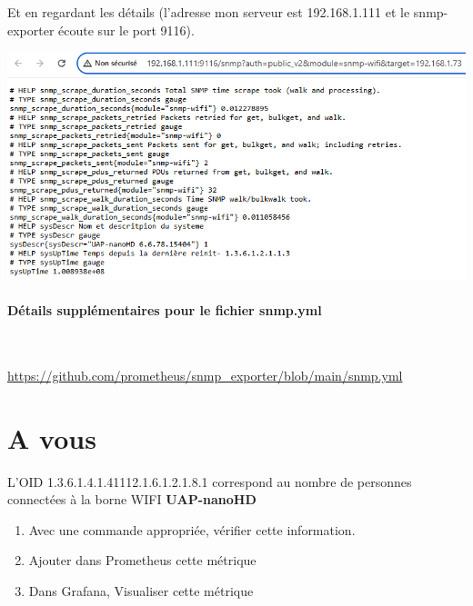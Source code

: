\documentclass[french, 12pt]{article}%
\newif\ifPROF
\begin{document}
Et en regardant les détails  (l'adresse mon serveur est 192.168.1.111 et le snmp-exporter écoute sur le port 9116).
\begin{center}
\includegraphics[scale=0.7]{./ressource/detailsSnmpWifi}
\end{center}

 
\paragraph{Détails supplémentaires pour le fichier snmp.yml} \  

\href{https://github.com/prometheus/snmp_exporter/blob/main/snmp.yml}{https://github.com/prometheus/snmp\_exporter/blob/main/snmp.yml}


\section{A vous}
L'OID 1.3.6.1.4.1.41112.1.6.1.2.1.8.1 correspond au nombre de personnes connectées à la borne WIFI \textbf{UAP-nanoHD}

\begin{enumerate}
\item Avec une commande appropriée, vérifier cette information. 
\item Ajouter dans Prometheus cette métrique
\item Dans Grafana, Visualiser cette métrique
\end{enumerate}

\ifPROF
\color{red}
\begin{lstlisting}[style=commande] 
#snmpwalk -v2c -c public 192.168.1.73 1.3.6.1.4.1.41112.1.6.1.2.1.8.1
snmpwalk -v2c -c public 192.168.1.31 1.3.6.1.4.1.41112.1.6.1.2.1.8.2
\end{lstlisting}
\normalcolor
\fi
\end{document}
